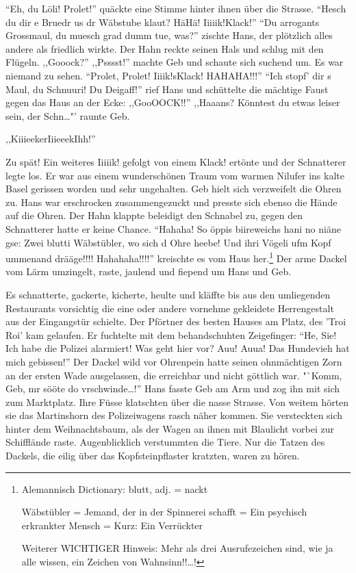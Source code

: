 \documentclass[11pt,titlepage,a5paper]{book}
\begin{document}
"`Eh, du Löli! Prolet!"' quäckte eine Stimme hinter ihnen über die Strasse. "`Hesch du dir e Bruedr us dr Wäbstube klaut? HäHä! Iiiiik!Klack!"' "`Du arrogants Grossmaul, du muesch grad dumm tue, was?"' zischte Hans, der plötzlich alles andere als friedlich wirkte. Der Hahn reckte seinen Hals und schlug mit den Flügeln. ,,Gooock?'' ,,Psssst!'' machte Geb und schaute sich suchend um. Es war niemand zu sehen. "`Prolet, Prolet! Iiiik!sKlack! HAHAHA!!!"' "`Ich stopf' dir s Maul, du Schnuuri! Du Deigaff!"' rief Hans und schüttelte die mächtige Faust gegen das Haus an der Ecke: ,,GooOOCK!!'' ,,Haaans? Könntest du etwas leiser sein, der Schn\dots"' raunte Geb. \begin{Large}
,,KiiieekerIiieeekIhh!''\end{Large} Zu spät! Ein weiteres Iiiiik! gefolgt von einem Klack! ertönte und der Schnatterer legte los. Er war aus einem wunderschönen Traum vom warmen Nilufer ins kalte Basel gerissen worden und sehr ungehalten. Geb hielt sich verzweifelt die Ohren zu. Hans war erschrocken zusammengezuckt und presste sich ebenso die Hände auf die Ohren. Der Hahn klappte beleidigt den Schnabel zu, gegen den Schnatterer hatte er keine Chance.  "`Hahaha! So öppis biireweichs hani no niäne gse: Zwei blutti Wäbstübler, wo sich d Ohre heebe! Und ihri Vögeli ufm Kopf ummenand drääge!!!! Hahahaha!!!!"' kreischte es vom Haus her.\footnote{Alemannisch Dictionary: blutt, adj. = nackt

Wäbstübler = Jemand, der in der Spinnerei schafft = Ein psychisch erkrankter Mensch = Kurz: Ein Verrückter

Weiterer WICHTIGER Hinweis: Mehr als drei Ausrufezeichen sind, wie ja alle wissen, ein Zeichen von Wahnsinn!!\dots !} Der arme Dackel vom Lärm umzingelt, raste, jaulend und fiepend um Hans und Geb.

Es schnatterte, gackerte, kicherte, heulte und kläffte bis aus den umliegenden Restaurants vorsichtig die eine oder andere vornehme gekleidete Herrengestalt aus der Eingangstür schielte. Der Pförtner des besten Hauses am Platz, des 'Troi Roi' kam gelaufen. Er fuchtelte mit dem behandschuhten Zeigefinger: "`He, Sie! Ich habe die Polizei alarmiert! Was geht hier vor? Auu! Auua! Das Hundevieh hat mich gebissen!"' Der Dackel wild vor Ohrenpein hatte seinen ohnmächtigen Zorn an der ersten Wade ausgelassen, die erreichbar und nicht göttlich war. "`Komm, Geb, mr sööte do vrschwinde\dots!'' Hans fasste Geb am Arm und zog ihn mit sich zum Marktplatz. Ihre Füsse klatschten über die nasse Strasse. Von weitem hörten sie das Martinshorn des Polizeiwagens rasch näher kommen. Sie versteckten sich  hinter dem Weihnachtsbaum, als der Wagen an ihnen mit Blaulicht vorbei zur Schifflände raste. Augenblicklich verstummten die Tiere. Nur die Tatzen des Dackels, die eilig über das Kopfsteinpflaster kratzten, waren zu hören.
\end{document}
